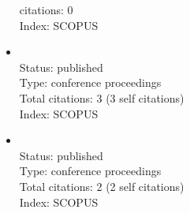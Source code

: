 \begin{itemize}
	citations: 0\\Index: SCOPUS \item{}\vspace{2mm}\\Status:
	published\\Type: conference proceedings\\Total citations: 3 (3 self citations)\\Index: SCOPUS
	\item{}\vspace{2mm}\\Status: published\\Type: conference
	proceedings\\Total citations: 2 (2 self citations)\\Index: SCOPUS
\end{itemize}
